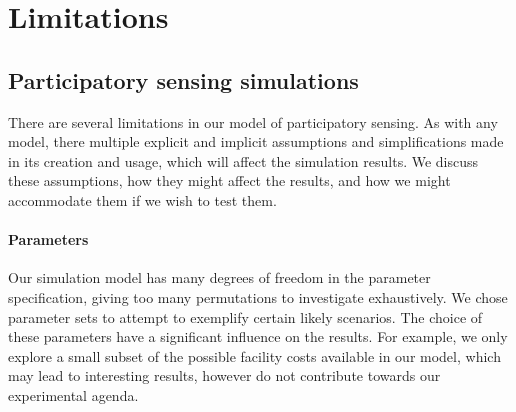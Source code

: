 


\section{Limitations}

\subsection{Participatory sensing simulations}

There are several limitations in our model of participatory sensing. As with
any model, there multiple explicit and implicit assumptions and
simplifications made in its creation and usage, which will affect the
simulation results. We discuss these assumptions, how they might affect the
results, and how we might accommodate them if we wish to test them.

\paragraph{Parameters} Our simulation model has many degrees of freedom in the
parameter specification, giving too many permutations to investigate
exhaustively. We chose parameter sets to attempt to exemplify certain likely
scenarios. The choice of these parameters have a significant influence on the
results. For example, we only explore a small subset of the possible facility costs
available in our model, which may lead to interesting results, however do not
contribute towards our experimental agenda.

